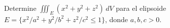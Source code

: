 Determine $\iiint_E(x^2+y^2+z^2)\,dV$ para el elipsoide $E=\{x^2/a^2+y^2/b^2+z^2/c^2\leq1\}$, donde $a,b,c>0$.
